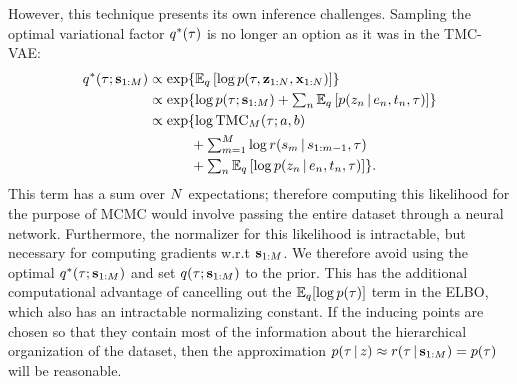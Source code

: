 However, this technique presents its own inference challenges.
Sampling the optimal variational factor $q^*(\tau)$
is no longer an option as it was in the TMC-VAE:
\begin{equation}
\begin{split}
    \q^*(\tree; \inducingpoints) 
    &\textstyle\propto \exp{\E_\q\left[\log \p(\tree, \latentdataset, \dataset)\right]} \\
    &\textstyle\propto \exp{\log \p(\tree ; \inducingpoints) + \sum_\n \E_\q\left[\p(\z_\n \given e_\n, t_\n, \tree)\right]} \\
    &\textstyle\propto \exp{\log \mathrm{TMC}_M(\tree; a, b)
    \\ &\textstyle\qquad\quad + \sum_{m = 1}^M \log r(\inducingpoint_m \given \inducingpoint_{1:m - 1}, \tree)
    \\ &\textstyle\qquad\quad + \sum_\n \E_\q\left[\log \p(\z_\n \given e_\n, t_\n, \tree)\right]}.
\end{split}
\end{equation}
This term has a sum over $N$ expectations; therefore computing this likelihood
for the purpose of MCMC
would involve passing the entire dataset through a neural network.
Furthermore, the normalizer for this likelihood is intractable,
but necessary for computing gradients w.r.t $\mathbf{s}_{1:M}$.
We therefore avoid using the optimal $q^*(\tau; \mathbf{s}_{1:M})$
and set
$q(\tau; \mathbf{s}_{1:M})$ to the prior.
This has the additional computational advantage of cancelling out
the $\mathbb{E}_q[\log p(\tau)]$ term in the ELBO, which also has an intractable normalizing constant.
If the inducing points are chosen so that they contain most of the information about the hierarchical organization of the dataset, then the approximation $p(\tau \,|\, z)\approx r(\tau \,|\, \mathbf{s}_{1:M})=p(\tau)$ will be reasonable.

